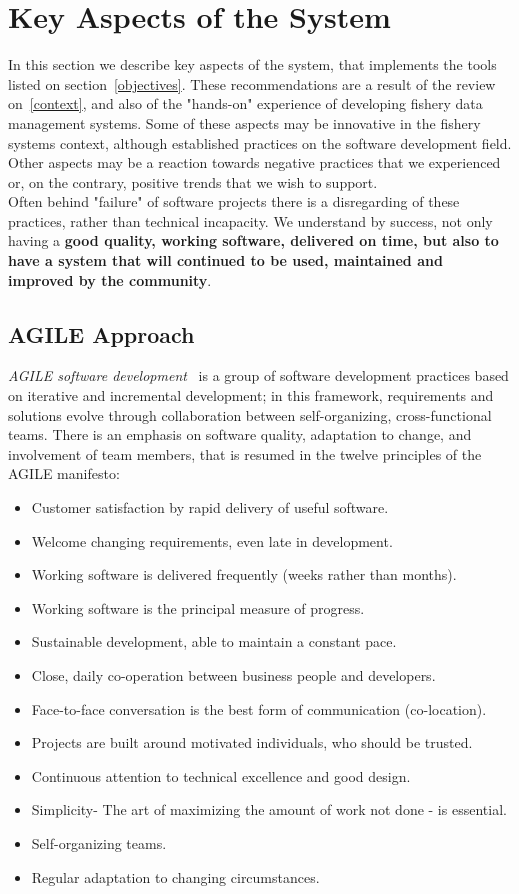 \documentclass[11pt]{article} %
\begin{document}
\section{Key Aspects of the System}\label{key}
In this section we describe key aspects of the system, that implements the tools listed on section~\ref{objectives}. These recommendations are a result of the review on~\ref{context}, and also of the "hands-on" experience of developing fishery data management systems. Some of these aspects may be innovative in the fishery systems context, although established practices on the software development field. Other aspects may be a reaction towards negative practices that we experienced or, on the contrary, positive trends that we wish to support.\\
Often behind "failure" of software projects there is a disregarding of these practices, rather than technical incapacity. We understand by success, not only having a \textbf{good quality, working software, delivered on time, but also to have a system that will continued to be used, maintained and improved by the community}.

\subsection{AGILE Approach}\label{agile}
\emph{AGILE software development}~\cite{agile} is a group of software development practices based on iterative and incremental development; in this framework, requirements and solutions evolve through collaboration between self-organizing, cross-functional teams. There is an emphasis on software quality, adaptation to change, and involvement of team members, that is resumed in the twelve principles of the AGILE manifesto:
\begin{itemize}
\item Customer satisfaction by rapid delivery of useful software.
\item Welcome changing requirements, even late in development.
\item Working software is delivered frequently (weeks rather than months).
\item Working software is the principal measure of progress.
\item Sustainable development, able to maintain a constant pace.
\item Close, daily co-operation between business people and developers.
\item Face-to-face conversation is the best form of communication (co-location).
\item Projects are built around motivated individuals, who should be trusted.
\item Continuous attention to technical excellence and good design.
\item Simplicity- The art of maximizing the amount of work not done - is essential.
\item Self-organizing teams.
\item Regular adaptation to changing circumstances.
\end{itemize}
\end{document}
